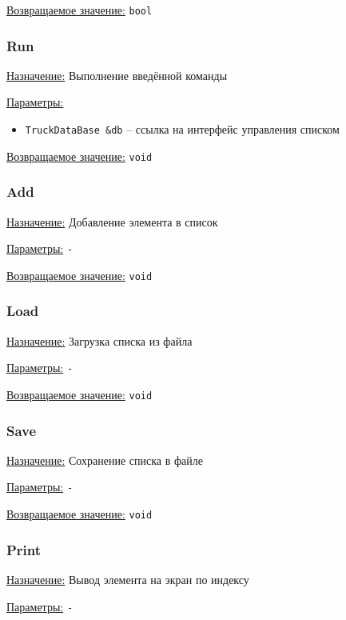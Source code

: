 \underline{Возвращаемое значение:} \verb|bool|


\subsubsection*{Run}

\underline{Назначение:} Выполнение введённой команды

\underline{Параметры:} 

\begin{itemize}
    \item \verb|TruckDataBase &db| -- ссылка на интерфейс управления списком
\end{itemize}

\underline{Возвращаемое значение:} \verb|void|


\subsubsection*{Add}

\underline{Назначение:} Добавление элемента в список

\underline{Параметры:} \verb|-|

\underline{Возвращаемое значение:} \verb|void|


\subsubsection*{Load}

\underline{Назначение:} Загрузка списка из файла

\underline{Параметры:} \verb|-|

\underline{Возвращаемое значение:} \verb|void|


\subsubsection*{Save}

\underline{Назначение:} Сохранение списка в файле

\underline{Параметры:} \verb|-|

\underline{Возвращаемое значение:} \verb|void|


\subsubsection*{Print}

\underline{Назначение:} Вывод элемента на экран по индексу

\underline{Параметры:} \verb|-|

